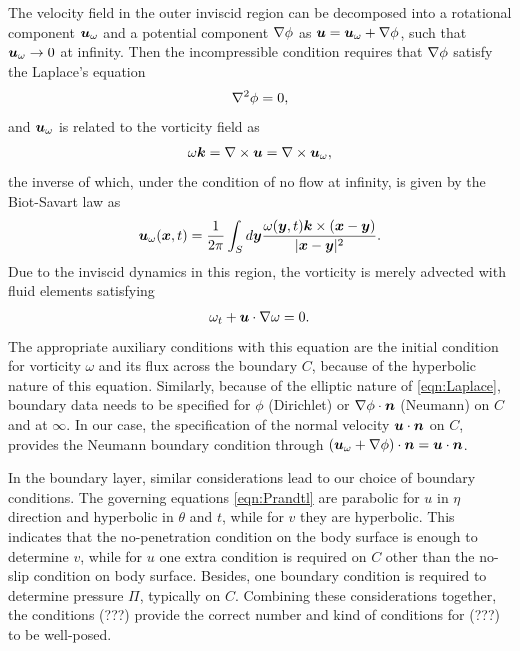 The velocity field in the outer inviscid region can be decomposed into a rotational component $\boldsymbol{u}_{\omega}$ and a potential component $\nabla \phi$ as $\boldsymbol{u} = \boldsymbol{u}_{\omega} + \nabla \phi$, such that $\boldsymbol{u}_\omega\to 0$ at infinity.
Then the incompressible condition requires that $\nabla \phi$ satisfy the Laplace's equation
\begin{align}
\label{eqn:Laplace}
\nabla^2 \phi = 0,
\end{align}
and $\boldsymbol{u}_\omega$ is related to the vorticity field as
\begin{align}
\omega \boldsymbol{k} = \nabla \times \boldsymbol{u} = \nabla \times \boldsymbol{u}_{\omega},
\end{align}
the inverse of which, under the condition of no flow at infinity, is given by the Biot-Savart law as
\begin{align}
\label{eqn:Biot-Savart}
\boldsymbol{u}_{\omega} (\boldsymbol{x}, t) =  \frac{1}{2\pi} \int_{S} d\boldsymbol{y} \frac{\omega(\boldsymbol{y}, t)\boldsymbol{k} \times (\boldsymbol{x} - \boldsymbol{y})}{|\boldsymbol{x} - \boldsymbol{y}|^2}.
\end{align}
Due to the inviscid dynamics in this region, the vorticity is merely advected with fluid elements satisfying
\begin{align}
 \omega_t + \boldsymbol{u}\cdot\nabla\omega = 0. \label{eqn:Vorticity}
\end{align}
The appropriate auxiliary conditions with this equation are the initial condition for vorticity $\omega$ and its flux across the boundary $C$, because of the hyperbolic nature of this equation. 
Similarly, because of the elliptic nature of \eqref{eqn:Laplace}, boundary data needs to be specified for $\phi$ (Dirichlet) or $\nabla \phi \cdot \boldsymbol{n}$ (Neumann) on $C$ and at $\infty$.
In our case, the specification of the normal velocity $\boldsymbol{u} \cdot \boldsymbol{n}$ on $C$, provides the Neumann boundary condition through $(\boldsymbol{u}_\omega + \nabla \phi) \cdot \boldsymbol{n} = \boldsymbol{u} \cdot \boldsymbol{n}$.

In the boundary layer, similar considerations lead to our choice of boundary conditions.
The governing equations \eqref{eqn:Prandtl} are parabolic for $u$ in $\eta$ direction and hyperbolic in $\theta$ and $t$, while for $v$ they are hyperbolic. 
This indicates that the no-penetration condition on the body surface is enough to determine $v$, while for $u$ one extra condition is required on $C$ other than the no-slip condition on body surface. 
Besides, one boundary condition is required to determine pressure $\Pi$, typically on $C$.
Combining these considerations together, the conditions (???) provide the correct number and kind of conditions for (???) to be well-posed. 

